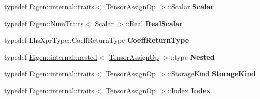 \begin{DoxyCompactItemize}
typedef \hyperlink{struct_eigen_1_1internal_1_1traits}{Eigen\+::internal\+::traits}$<$ \hyperlink{class_eigen_1_1_tensor_assign_op}{Tensor\+Assign\+Op} $>$\+::Scalar {\bfseries Scalar}
\item 
\mbox{\label{class_eigen_1_1_tensor_assign_op_a9e5ccae9ca80d593a8a3ed5d52e63285}} 
typedef \hyperlink{group___core___module_struct_eigen_1_1_num_traits}{Eigen\+::\+Num\+Traits}$<$ Scalar $>$\+::Real {\bfseries Real\+Scalar}
\item 
\mbox{\label{class_eigen_1_1_tensor_assign_op_a2dfd9c5649eaae4565082b6bdc944270}} 
typedef Lhs\+Xpr\+Type\+::\+Coeff\+Return\+Type {\bfseries Coeff\+Return\+Type}
\item 
\mbox{\label{class_eigen_1_1_tensor_assign_op_a5e996d5a20f68bfdfc513d31ae44a097}} 
typedef \hyperlink{struct_eigen_1_1internal_1_1nested}{Eigen\+::internal\+::nested}$<$ \hyperlink{class_eigen_1_1_tensor_assign_op}{Tensor\+Assign\+Op} $>$\+::type {\bfseries Nested}
\item 
\mbox{\label{class_eigen_1_1_tensor_assign_op_a2fadabb31eae9e236d39c4a9894ff2f8}} 
typedef \hyperlink{struct_eigen_1_1internal_1_1traits}{Eigen\+::internal\+::traits}$<$ \hyperlink{class_eigen_1_1_tensor_assign_op}{Tensor\+Assign\+Op} $>$\+::Storage\+Kind {\bfseries Storage\+Kind}
\item 
\mbox{\label{class_eigen_1_1_tensor_assign_op_af16807ed07f0f32cb5cacbe8b287b78d}} 
typedef \hyperlink{struct_eigen_1_1internal_1_1traits}{Eigen\+::internal\+::traits}$<$ \hyperlink{class_eigen_1_1_tensor_assign_op}{Tensor\+Assign\+Op} $>$\+::Index {\bfseries Index}
\end{DoxyCompactItemize}
